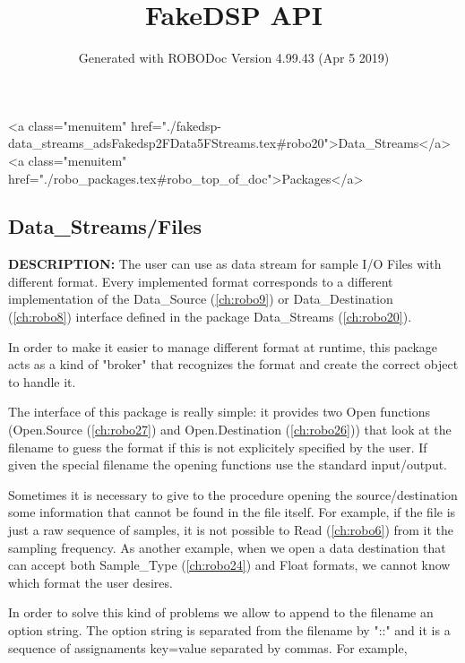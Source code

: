 \documentclass{article}
\title{FakeDSP API}
\author{Generated with ROBODoc Version 4.99.43 (Apr  5 2019)
}
\begin{document}
\maketitle
\printindex
\tableofcontents
\newpage

<a class="menuitem" href="./fakedsp-data_streams_adsFakedsp2FData5FStreams.tex#robo20">Data_Streams</a><a class="menuitem" href="./robo_packages.tex#robo_top_of_doc">Packages</a>\subsection{Data\_Streams/Files}
\textbf{DESCRIPTION:}\hspace{0.08in}
    The user can use as data stream for sample I/O Files with different
    format.  Every implemented format corresponds to a different implementation
    of the Data\_Source (\ref{ch:robo9}) or Data\_Destination (\ref{ch:robo8}) interface defined in the package
    Data\_Streams (\ref{ch:robo20}).



    In order to make it easier to manage different format at runtime,
    this package acts as a kind of "broker" that recognizes the format
    and create the correct object to handle it.



    The interface of this package is really simple: it provides two
    Open functions (Open.Source (\ref{ch:robo27}) and Open.Destination (\ref{ch:robo26})) that look
    at the filename to guess the format if this is not explicitely
    specified by the user.  If given the special filename the opening
    functions use the standard input/output.






    Sometimes it is necessary to give to the procedure opening the
    source/destination some information that cannot be found in the
    file itself.  For example, if the file is just a raw sequence
    of samples, it is not possible to Read (\ref{ch:robo6}) from it the sampling
    frequency.  As another example, when we open a data destination
    that can accept both Sample\_Type (\ref{ch:robo24}) and Float formats, we cannot know
    which format the user desires.



    In order to solve this kind of problems we allow to append to the
    filename an option string.  The option string is separated from
    the filename by "::" and it is a sequence of assignaments
    key=value separated by commas.  For example,
\end{document}
